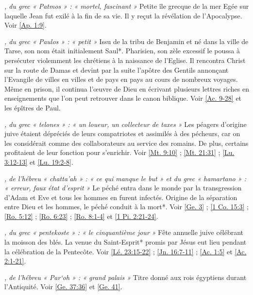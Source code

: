 \begin{multicols}{2}
\textit{, du grec « Patmos » : « mortel, fascinant »}\newline
Petite île grecque de la mer Egée sur laquelle Jean fut exilé à la fin de sa vie. Il y reçut la révélation de l'Apocalypse. Voir \vref{Ap. 1:9}.

\textit{, du grec « Paulos » : « petit »}\newline
Issu de la tribu de Benjamin et né dans la ville de Tarse, son nom était initialement Saul*. Pharisien, son zèle excessif le poussa à persécuter violemment les chrétiens à la naissance de l'Eglise. Il rencontra Christ sur la route de Damas et devint par la suite l'apôtre des Gentils annonçant l'Evangile de villes en villes et de pays en pays au cours de nombreux voyages. Même en prison, il continua l'œuvre de Dieu en écrivant plusieurs lettres riches en enseignements que l'on peut retrouver dans le canon biblique. Voir \vref{Ac. 9-28} et les épîtres de Paul.

\textit{, du grec « telones » : « un loueur, un collecteur de taxes »}\newline
Les péagers d'origine juive étaient dépréciés de leurs compatriotes et assimilés à des pécheurs, car on les considérait comme des collaborateurs au service des romains. De plus, certains profitaient de leur fonction pour s'enrichir. Voir \vref{Mt. 9:10} ; \vref{Mt. 21:31} ; \vref{Lu. 3:12-13} et \vref{Lu. 19:2-8}.

\textit{, de l'hébreu « chatta'ah » : « ce qui manque le but » et du grec « hamartano » : « erreur, faux état d'esprit »}\newline
Le péché entra dans le monde par la transgression d'Adam et Eve et tous les hommes en furent infectés. Origine de la séparation entre Dieu et les hommes, le péché conduit à la mort*. Voir \vref{Ge. 3} ; \vref{1 Co. 15:3} ; \vref{Ro. 5:12} ; \vref{Ro. 6:23} ; \vref{Ro. 8:1-4} et \vref{1 Pi. 2:21-24}.

\textit{, du grec « pentekoste » : « le cinquantième jour »}\newline
Fête annuelle juive célébrant la moisson des blés. La venue du Saint-Esprit* promis par Jésus eut lieu pendant la célébration de la Pentecôte. Voir \vref{Lé. 23:15-22} ; \vref{Jn. 16:7-11} ; \vref{Ac. 1:5} et \vref{Ac. 2:1-21}.

\textit{, de l'hébreu « Par`oh » : « grand palais »}\newline
Titre donné aux rois égyptiens durant l'Antiquité. Voir \vref{Ge. 37:36} et \vref{Ge. 41}.


\end{multicols}
